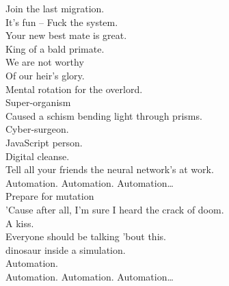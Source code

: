 
\label{album:kg}









Join the last migration. \\
It's fun -- Fuck the system. \\
Your new best mate is great. \\
King of a bald primate. \\
We are not worthy \\
Of our heir's glory. \\
Mental rotation for the overlord. \\

Super-organism \\
Caused a schism bending light through prisms. \\
Cyber-surgeon. \\
JavaScript person. \\
Digital cleanse. \\
Tell all your friends the neural network's at work. \\

Automation. Automation. Automation… \\

Prepare for mutation \\
'Cause after all, I'm sure I heard the crack of doom. \\
A  kiss. \\
Everyone should be talking 'bout this. \\
  dinosaur inside a simulation. \\
Automation. \\

Automation. Automation. Automation… \\



